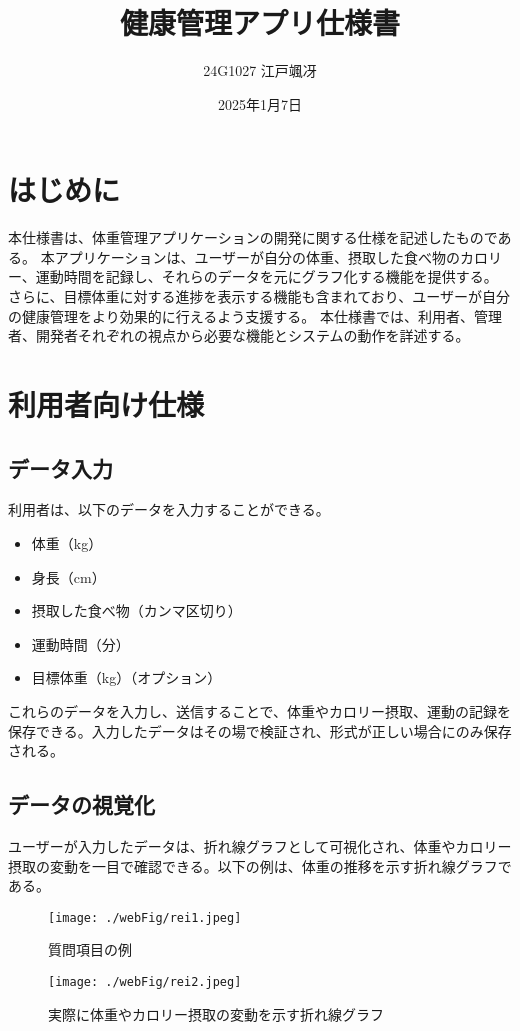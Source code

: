 \documentclass[uplatex,dvipdfmx]{jsarticle}
\begin{document}
\title{健康管理アプリ仕様書}
\author{24G1027 江戸颯冴}
\date{2025年1月7日}
\maketitle

\section{はじめに}

本仕様書は、体重管理アプリケーションの開発に関する仕様を記述したものである。
本アプリケーションは、ユーザーが自分の体重、摂取した食べ物のカロリー、運動時間を記録し、それらのデータを元にグラフ化する機能を提供する。
さらに、目標体重に対する進捗を表示する機能も含まれており、ユーザーが自分の健康管理をより効果的に行えるよう支援する。
本仕様書では、利用者、管理者、開発者それぞれの視点から必要な機能とシステムの動作を詳述する。

\section{利用者向け仕様}

\subsection{データ入力}
利用者は、以下のデータを入力することができる。
\begin{itemize}
    \item 体重（kg）
    \item 身長（cm）
    \item 摂取した食べ物（カンマ区切り）
    \item 運動時間（分）
    \item 目標体重（kg）（オプション）
\end{itemize}

これらのデータを入力し、送信することで、体重やカロリー摂取、運動の記録を保存できる。入力したデータはその場で検証され、形式が正しい場合にのみ保存される。

\subsection{データの視覚化}
ユーザーが入力したデータは、折れ線グラフとして可視化され、体重やカロリー摂取の変動を一目で確認できる。以下の例は、体重の推移を示す折れ線グラフである。

\begin{figure}[H]
    \centering
    \begin{minipage}{0.45\textwidth}  %
        \centering
        \texttt{[image: ./webFig/rei1.jpeg]}
        \caption{質問項目の例}
        \label{fig:left_image}
    \end{minipage}
    \hspace{0.05\textwidth}  %
    \begin{minipage}{0.45\textwidth}  %
        \centering
        \texttt{[image: ./webFig/rei2.jpeg]}
        \caption{実際に体重やカロリー摂取の変動を示す折れ線グラフ}
        \label{fig:right_image}
    \end{minipage}
\end{figure}
\end{document}
